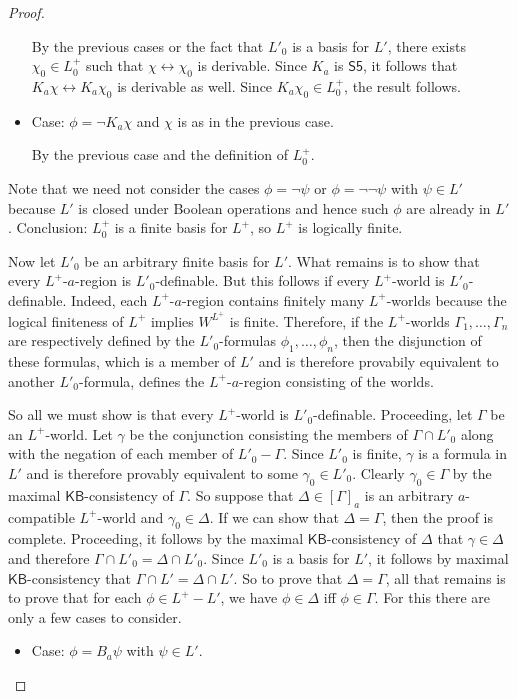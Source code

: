 \documentclass[12pt]{article}
\theoremstyle{definition}
\newcommand{\KB}{{\mathsf{KB}}}                        %
\begin{document}
\begin{proof}
\begin{itemize}
    By the previous cases or the fact that $L'_0$ is a basis for $L'$,
    there exists $\chi_0\in L^+_0$ such that
    $\chi\leftrightarrow\chi_0$ is derivable.  Since $K_a$ is
    $\textsf{S5}$, it follows that $K_a\chi\leftrightarrow K_a\chi_0$
    is derivable as well.  Since $K_a\chi_0\in L^+_0$, the result
    follows.

  \item Case: $\phi=\lnot K_a\chi$ and $\chi$ is as in the previous case.

    By the previous case and the definition of $L^+_0$.
  \end{itemize}
  Note that we need not consider the cases $\phi=\lnot\psi$ or
  $\phi=\lnot\lnot\psi$ with $\psi\in L'$ because $L'$ is closed under
  Boolean operations and hence such $\phi$ are already in $L'$.
  Conclusion: $L^+_0$ is a finite basis for $L^+$, so $L^+$ is
  logically finite.

  Now let $L'_0$ be an arbitrary finite basis for $L'$.  What remains
  is to show that every $L^+$-$a$-region is $L'_0$-definable. But this
  follows if every $L^+$-world is $L'_0$-definable.  Indeed, each
  $L^+$-$a$-region contains finitely many $L^+$-worlds because the
  logical finiteness of $L^+$ implies $W^{L^+}$ is finite.  Therefore,
  if the $L^+$-worlds $\Gamma_1,\dots,\Gamma_n$ are respectively
  defined by the $L'_0$-formulas $\phi_1,\dots,\phi_n$, then the
  disjunction of these formulas, which is a member of $L'$ and is
  therefore provabily equivalent to another $L'_0$-formula, defines
  the $L^+$-$a$-region consisting of the worlds.

  So all we must show is that every $L^+$-world is $L'_0$-definable.
  Proceeding, let $\Gamma$ be an $L^+$-world.  Let $\gamma$ be the
  conjunction consisting the members of $\Gamma\cap L'_0$ along with
  the negation of each member of $L'_0-\Gamma$.  Since $L'_0$ is
  finite, $\gamma$ is a formula in $L'$ and is therefore provably
  equivalent to some $\gamma_0\in L'_0$.  Clearly $\gamma_0\in\Gamma$
  by the maximal $\KB$-consistency of $\Gamma$.  So suppose that
  $\Delta\in[\Gamma]_a$ is an arbitrary $a$-compatible $L^+$-world and
  $\gamma_0\in\Delta$.  If we can show that $\Delta=\Gamma$, then the
  proof is complete.  Proceeding, it follows by the maximal
  $\KB$-consistency of $\Delta$ that $\gamma\in\Delta$ and therefore
  $\Gamma\cap L'_0=\Delta\cap L'_0$.  Since $L'_0$ is a basis for
  $L'$, it follows by maximal $\KB$-consistency that $\Gamma\cap
  L'=\Delta\cap L'$.  So to prove that $\Delta=\Gamma$, all that
  remains is to prove that for each $\phi\in L^+-L'$, we have
  $\phi\in\Delta$ iff $\phi\in\Gamma$.  For this there are only a few
  cases to consider.
  \begin{itemize}
  \item Case: $\phi=B_a\psi$ with $\psi\in L'$.


\end{itemize}
\end{proof}
\end{document}
